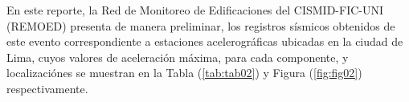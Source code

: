 \documentclass[11pt, a4paper]{report}
\begin{document}
\begin{figure}[H]
\begin{multicols}{2}
        \begin{minipage}[c]{8.2cm}
            \centering %
            \setlength\fboxsep{0pt}
            \setlength\fboxrule{0.3pt}
              \label{fig:fig01}
        \end{minipage}
    \end{multicols} 
\end{figure}

\vspace{1cm}

\noindent
En este reporte, la Red de Monitoreo de Edificaciones del CISMID-FIC-UNI (REMOED) presenta de manera
preliminar, los registros sísmicos obtenidos de este evento correspondiente a  estaciones 
acelerográficas ubicadas en la ciudad de Lima, cuyos valores de aceleración máxima, para cada 
componente, y localizaciónes se muestran en la Tabla (\ref{tab:tab02}) y Figura (\ref{fig:fig02}) respectivamente.\\
\end{document}
